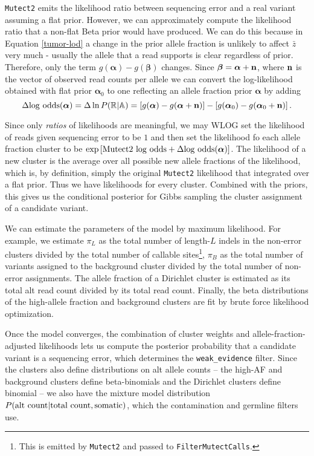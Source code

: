 \documentclass[nofootinbib,amssymb,amsmath]{revtex4}
\newcommand{\vn}{{\bf n}}
\newcommand{\valpha}{{\bm{\alpha}}}
\newcommand{\vbeta}{{\bm{\beta}}}
\newcommand{\code}[1]{\texttt{#1}}
\begin{document}
\code{Mutect2} emits the likelihood ratio between sequencing error and a real variant assuming a flat prior.  However, we can approximately compute the likelihood ratio that a non-flat Beta prior would have produced.  We can do this because in Equation \ref{tumor-lod} a change in the prior allele fraction is unlikely to affect $\bar{z}$ very much - usually the allele that a read supports is clear regardless of prior.  Therefore, only the term $g(\valpha) - g(\vbeta)$ changes.  Since $\vbeta = \valpha + \vn$, where $\vn$ is the vector of observed read counts per allele we can convert the log-likelihood obtained with flat prior $\valpha_0$ to one reflecting an allele fraction prior $\valpha$ by adding
\begin{equation}
\Delta {\rm log~odds}(\valpha) = \Delta \ln P(\mathbb{R} | \mathbb{A}) = \left[ g(\valpha) - g(\valpha + \vn) \right] - \left[ g(\valpha_0) - g(\valpha_0 + \vn) \right].
\end{equation}

Since only \textit{ratios} of likelihoods are meaningful, we may WLOG set the likelihood of reads given sequencing error to be $1$ and then set the likelihood fo each allele fraction cluster to be $\exp \left[ {\rm Mutect2~log~odds} + \Delta {\rm log~odds}(\valpha) \right]$.  The likelihood of a new cluster is the average over all possible new allele fractions of the likelihood, which is, by definition, simply the original \code{Mutect2} likelihood that integrated over a flat prior.  Thus we have likelihoods for every cluster.  Combined with the priors, this gives us the conditional posterior for Gibbs sampling the cluster assignment of a candidate variant.

We can estimate the parameters of the model by maximum likelihood.  For example, we estimate $\pi_L$ as the total number of length-$L$ indels in the non-error clusters divided by the total number of callable sites\footnote{This is emitted by \code{Mutect2} and passed to \code{FilterMutectCalls}.}, $\pi_B$ as the total number of variants assigned to the background cluster divided by the total number of non-error assignments.  The allele fraction of a Dirichlet cluster is estimated as its total alt read count divided by its total read count.  Finally, the beta distributions of the high-allele fraction and background clusters are fit by brute force likelihood optimization.

Once the model converges, the combination of cluster weights and allele-fraction-adjusted likelihoods lets us compute the posterior probability that a candidate variant is a sequencing error, which determines the \code{weak\_evidence} filter.  Since the clusters also define distributions on alt allele counts -- the high-AF and background clusters define beta-binomials and the Dirichlet clusters define binomial -- we also have the mixture model distribution $P({\rm alt~count} | {\rm total~count}, {\rm somatic})$, which the contamination and germline filters use.
\end{document}

